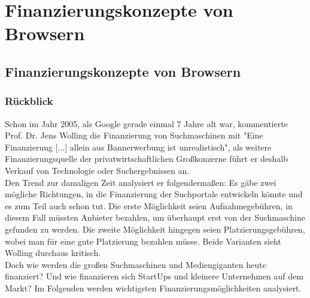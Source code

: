 \documentclass[11pt]{report}
\begin{document}
    \chapter{Finanzierungskonzepte von Browsern}\label{ch:finanzierungskonzepte-von-browsern}

    \section{Finanzierungskonzepte von Browsern}\label{sec:finanzierungskonzepte-von-browsern}

    \subsection{Rückblick}\label{subsec:rueckblick}
    Schon im Jahr 2005, als Google gerade einmal 7 Jahre alt war, kommentierte Prof. Dr. Jens Wolling die Finanzierung von Suchmaschinen mit "Eine Finanzierung [...] allein aus Bannerwerbung ist unrealistisch"\cite{[WOL05]}, als weitere Finanzierungsquelle der privatwirtschaftlichen Großkonzerne führt er deshalb Verkauf von Technologie oder
    Suchergebnissen an.\cite{[WOL05]}\\

    Den Trend zur damaligen Zeit analysiert er folgendermaßen: Es gäbe zwei mögliche Richtungen, in die Finanzierung der Suchportale entwickeln könnte und es zum Teil auch schon tut.
    Die erste Möglichkeit seien Aufnahmegebühren, in diesem Fall müssten Anbieter bezahlen, um überhaupt erst von der Suchmaschine gefunden zu werden.
    Die zweite Möglichkeit hingegen seien Platzierungsgebühren, wobei man für eine gute Platzierung bezahlen müsse.
    Beide Varianten sieht Wolling durchaus kritisch.\cite{[WOL05]}\\

    Doch wie werden die großen Suchmaschinen und Mediengiganten heute finanziert? Und wie finanzieren sich StartUps und kleinere Unternehmen auf dem Markt?
    Im Folgenden werden wichtigsten Finanzierungsmöglichkeiten analysiert.
\end{document}
